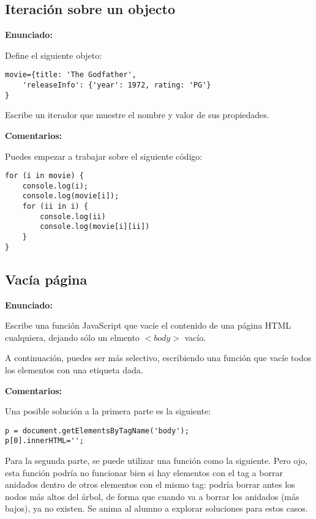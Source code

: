 \subsection{Iteración sobre un objecto}
\label{subsec:eje-js-iteracion-objeto}

\textbf{Enunciado:}

Define el siguiente objeto:

\begin{verbatim}
movie={title: 'The Godfather',
    'releaseInfo': {'year': 1972, rating: 'PG'}
}
\end{verbatim}

Escribe un iterador que muestre el nombre y valor de sus propiedades.

\textbf{Comentarios:}

Puedes empezar a trabajar sobre el siguiente código:

\begin{verbatim}
for (i in movie) {
    console.log(i);
    console.log(movie[i]);
    for (ii in i) {
        console.log(ii)
        console.log(movie[i][ii])
    }
}
\end{verbatim}

\subsection{Vacía página}
\label{subsec:eje-js-vacia-pagina}

\textbf{Enunciado:}

Escribe una función JavaScript que vacíe el contenido de una página HTML cualquiera, dejando sólo un elmento $<body>$ vacío.

A continuación, puedes ser más selectivo, escribiendo una función que vacíe todos los elementos con una etiqueta dada.

\textbf{Comentarios:}

Una posible solución a la primera parte es la siguiente:

\begin{verbatim}
p = document.getElementsByTagName('body');
p[0].innerHTML='';
\end{verbatim}

Para la segunda parte, se puede utilizar una función como la siguiente. Pero ojo, esta función podría no funcionar bien si hay elementos con el tag a borrar anidados dentro de otros elementos con el mismo tag: podría borrar antes los nodos más altos del árbol, de forma que cuando va a borrar los anidados (más bajos), ya no existen. Se anima al alumno a explorar soluciones para estos casos.

